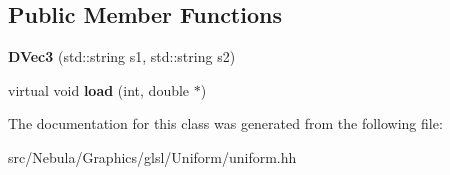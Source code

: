 \subsection*{\-Public \-Member \-Functions}
\begin{DoxyCompactItemize}
\item 
\hypertarget{classNeb_1_1glsl_1_1Uniform_1_1Vector_1_1DVec3_a0eafe586b49fbf3f40483014ee8ab93d}{{\bfseries \-D\-Vec3} (std\-::string s1, std\-::string s2)}\label{classNeb_1_1glsl_1_1Uniform_1_1Vector_1_1DVec3_a0eafe586b49fbf3f40483014ee8ab93d}

\item 
\hypertarget{classNeb_1_1glsl_1_1Uniform_1_1Vector_1_1DVec3_a259ae2290abc4445a5c661d2547597b5}{virtual void {\bfseries load} (int, double $\ast$)}\label{classNeb_1_1glsl_1_1Uniform_1_1Vector_1_1DVec3_a259ae2290abc4445a5c661d2547597b5}

\end{DoxyCompactItemize}


\-The documentation for this class was generated from the following file\-:\begin{DoxyCompactItemize}
\item 
src/\-Nebula/\-Graphics/glsl/\-Uniform/uniform.\-hh\end{DoxyCompactItemize}
